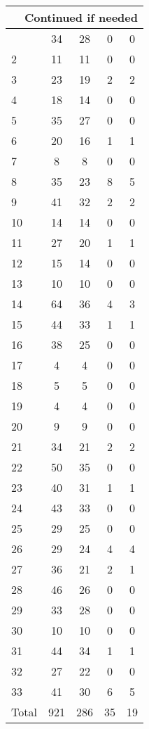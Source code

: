 \begin{center}
\begin{longtable}{l|c|c|c|c}
\hline \multicolumn{5}{|r|}{{Continued if needed}} \\ \hline
\endfoot 
1 & 34 & 28 & 0 & 0\\ \hline
2 & 11 & 11 & 0 & 0\\ \hline
3 & 23 & 19 & 2 & 2\\ \hline
4 & 18 & 14 & 0 & 0\\ \hline
5 & 35 & 27 & 0 & 0\\ \hline
6 & 20 & 16 & 1 & 1\\ \hline
7 & 8 & 8 & 0 & 0\\ \hline
8 & 35 & 23 & 8 & 5\\ \hline
9 & 41 & 32 & 2 & 2\\ \hline
10 & 14 & 14 & 0 & 0\\ \hline
11 & 27 & 20 & 1 & 1\\ \hline
12 & 15 & 14 & 0 & 0\\ \hline
13 & 10 & 10 & 0 & 0\\ \hline
14 & 64 & 36 & 4 & 3\\ \hline
15 & 44 & 33 & 1 & 1\\ \hline
16 & 38 & 25 & 0 & 0\\ \hline
17 & 4 & 4 & 0 & 0\\ \hline
18 & 5 & 5 & 0 & 0\\ \hline
19 & 4 & 4 & 0 & 0\\ \hline
20 & 9 & 9 & 0 & 0\\ \hline
21 & 34 & 21 & 2 & 2\\ \hline
22 & 50 & 35 & 0 & 0\\ \hline
23 & 40 & 31 & 1 & 1\\ \hline
24 & 43 & 33 & 0 & 0\\ \hline
25 & 29 & 25 & 0 & 0\\ \hline
26 & 29 & 24 & 4 & 4\\ \hline
27 & 36 & 21 & 2 & 1\\ \hline
28 & 46 & 26 & 0 & 0\\ \hline
29 & 33 & 28 & 0 & 0\\ \hline
30 & 10 & 10 & 0 & 0\\ \hline
31 & 44 & 34 & 1 & 1\\ \hline
32 & 27 & 22 & 0 & 0\\ \hline
33 & 41 & 30 & 6 & 5\\ \hline
\hline \hline
Total & 921 & 286 & 35 & 19



\end{longtable}
\end{center}

